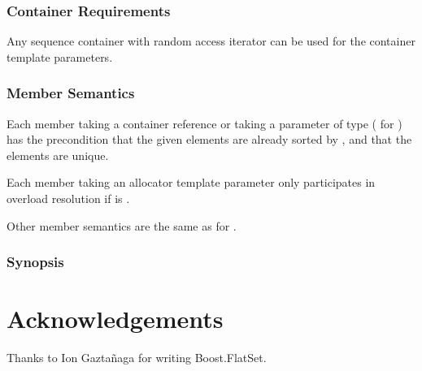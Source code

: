\subsubsection{Container Requirements}

Any sequence container with random access iterator can be used for the
container template parameters.

\subsubsection{Member Semantics}

Each member taking a container reference or taking a parameter of type
 ( for ) has the
precondition that the given elements are already sorted by , and
that the elements are unique.

Each member taking an allocator template parameter only participates in
overload resolution if  is
.

Other member semantics are the same as for .

\subsubsection{ Synopsis}




\section{Acknowledgements}

Thanks to Ion Gazta\~{n}aga for writing Boost.FlatSet.
